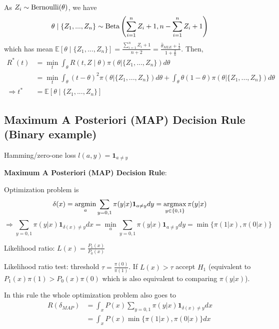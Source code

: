 \documentclass[11pt]{elegantbook}
\newcommand{\argmax}{\operatornamewithlimits{argmax}}
\newcommand{\argmin}{\operatornamewithlimits{argmin}}
\begin{document}
\begin{example}
\begin{equation}
\begin{aligned}
        \end{aligned}
        \nonumber
    \end{equation}
    As $Z_i\sim \textnormal{Bernoulli}(\theta)$, we have $$\theta\mid \{Z_1,...,Z_n\}\sim \textnormal{Beta}\left(\sum_{i=1}^n Z_i+1, n- \sum_{i=1}^n Z_i+1\right)$$
    which has mean $\mathbb{E}[\theta\mid \{Z_1,...,Z_n\}]=\frac{\sum_{i=1}^n Z_i+1}{n+2}=\frac{\hat{\theta}_{MLE}+\frac{1}{2}}{1+\frac{2}{n}}$.
    Then,
    \begin{equation}
        \begin{aligned}
            R^*(t)&=\min_t\int_\theta R(t,Z\mid \theta) \pi(\theta| \{Z_1,...,Z_n\}) d\theta\\
            &=\min_t \int_\theta (t-\theta)^2 \pi(\theta| \{Z_1,...,Z_n\}) d\theta+\int_\theta \theta(1-\theta)\pi(\theta| \{Z_1,...,Z_n\}) d\theta\\
            \Rightarrow t^*&=\mathbb{E}[\theta\mid \{Z_1,...,Z_n\}]
        \end{aligned}
        \nonumber
    \end{equation}
\end{example}


\subsection{Maximum A Posteriori (MAP) Decision Rule (Binary example)}
\begin{example}
    Hamming/zero-one loss $l(a,y)=\mathbf{1}_{a\neq y}$
\end{example}

\textbf{Maximum A Posteriori (MAP) Decision Rule}:

Optimization problem is $$\delta(x)=\argmin_{a} \sum_{y=0,1} \pi(y|x) \mathbf{1}_{a\neq y} dy=\argmax_{y\in\{0,1\}}\pi(y|x)$$
$$\Rightarrow \sum_{y=0,1} \pi(y|x) \mathbf{1}_{\delta(x)\neq y} dx=\min_{a} \sum_{y=0,1} \pi(y|x) \mathbf{1}_{a\neq y} dy=\min\{\pi(1|x),\pi(0|x)\}$$

Likelihood ratio: $L(x)=\frac{P_1(x)}{P_0(x)}$

Likelihood ratio test: threshold $\tau=\frac{\pi(0)}{\pi(1)}$. If $L(x)>\tau$ accept $H_1$ (equivalent to $P_1(x)\pi(1)>P_0(x)\pi(0)$ which is also equivalent to comparing $\pi(y|x)$).

In this rule the whole optimization problem also goes to
\begin{equation}
    \begin{aligned}
        R(\delta_{MAP})&=\int_x P(x)\sum_{y=0,1} \pi(y|x) \mathbf{1}_{\delta(x)\neq y} dx\\
        &=\int_x P(x)\min\{\pi(1|x),\pi(0|x)\}dx
    \end{aligned}
    \nonumber
\end{equation}
\end{document}
